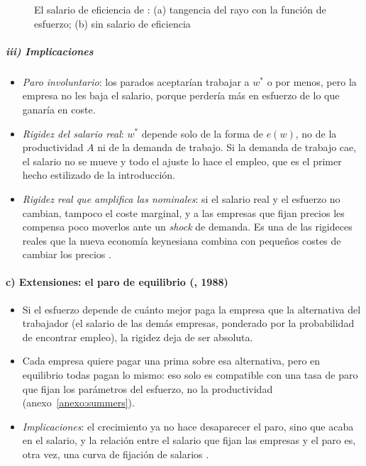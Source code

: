 \documentclass[11pt]{article}
\begin{document}
\begin{figure}[H]
\centering
\caption{El salario de eficiencia de : (a) tangencia del rayo con la función de esfuerzo; (b) sin salario de eficiencia}\label{fig:solow-esfuerzo}
\end{figure}

\subparagraph{iii) Implicaciones}

\begin{itemize}
\item \emph{Paro involuntario}: los parados aceptarían trabajar a $w^*$ o por menos, pero la empresa no les baja el salario, porque perdería más en esfuerzo de lo que ganaría en coste.
\item \emph{Rigidez del salario real}: $w^*$ depende solo de la forma de $e(w)$, no de la productividad $A$ ni de la demanda de trabajo. Si la demanda de trabajo cae, el salario no se mueve y todo el ajuste lo hace el empleo, que es el primer hecho estilizado de la introducción.
\item \emph{Rigidez real que amplifica las nominales}: si el salario real y el esfuerzo no cambian, tampoco el coste marginal, y a las empresas que fijan precios les compensa poco moverlos ante un \emph{shock} de demanda. Es una de las rigideces reales que la nueva economía keynesiana combina con pequeños costes de cambiar los precios\nocite{BallRomer1990Real} .
\end{itemize}

\paragraph{c) Extensiones: el paro de equilibrio (, 1988)}

\begin{itemize}
\item Si el esfuerzo depende de cuánto mejor paga la empresa que la alternativa del trabajador (el salario de las demás empresas, ponderado por la probabilidad de encontrar empleo), la rigidez deja de ser absoluta\nocite{Summers1988Relative}.
\item Cada empresa quiere pagar una prima sobre esa alternativa, pero en equilibrio todas pagan lo mismo: eso solo es compatible con una tasa de paro que fijan los parámetros del esfuerzo, no la productividad (anexo~\ref{anexo:summers}).
\item \emph{Implicaciones}: el crecimiento ya no hace desaparecer el paro, sino que acaba en el salario, y la relación entre el salario que fijan las empresas y el paro es, otra vez, una curva de fijación de salarios .
\end{itemize}
\end{document}
